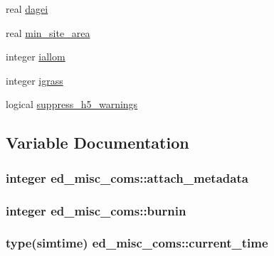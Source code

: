 \begin{DoxyCompactItemize}
\item 
real \hyperlink{namespaceed__misc__coms_a6dedccb6bd1fa55c04ad14eee4ddb95e}{dagei}
\item 
real \hyperlink{namespaceed__misc__coms_ab0d2bac6650ffb4e0fefdb6380ae1c38}{min\+\_\+site\+\_\+area}
\item 
integer \hyperlink{namespaceed__misc__coms_a63c098b4f6d8333d0ce468bc75088832}{iallom}
\item 
integer \hyperlink{namespaceed__misc__coms_a6494bf5748198e80e5a1af43ec3f497f}{igrass}
\item 
logical \hyperlink{namespaceed__misc__coms_ac658bfc9ea442f9905a0a857e1a82f96}{suppress\+\_\+h5\+\_\+warnings}
\end{DoxyCompactItemize}


\subsection{Variable Documentation}
\subsubsection[{\texorpdfstring{attach\+\_\+metadata}{attach_metadata}}]{\setlength{\rightskip}{0pt plus 5cm}integer ed\+\_\+misc\+\_\+coms\+::attach\+\_\+metadata}\hypertarget{namespaceed__misc__coms_afb7de717ec53503d518604da7c021e1a}{}\label{namespaceed__misc__coms_afb7de717ec53503d518604da7c021e1a}
\subsubsection[{\texorpdfstring{burnin}{burnin}}]{\setlength{\rightskip}{0pt plus 5cm}integer ed\+\_\+misc\+\_\+coms\+::burnin}\hypertarget{namespaceed__misc__coms_a9b554bb456be251df521579a073ec34d}{}\label{namespaceed__misc__coms_a9b554bb456be251df521579a073ec34d}
\subsubsection[{\texorpdfstring{current\+\_\+time}{current_time}}]{\setlength{\rightskip}{0pt plus 5cm}type({\bf simtime}) ed\+\_\+misc\+\_\+coms\+::current\+\_\+time}\hypertarget{namespaceed__misc__coms_a74892b22b952f148c3ba1bfb0f150692}{}\label{namespaceed__misc__coms_a74892b22b952f148c3ba1bfb0f150692}
